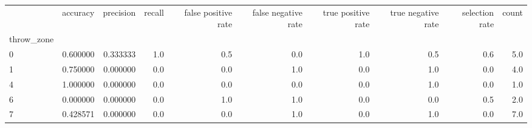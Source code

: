 \begin{tabular}{lrrrrrrrrr}
\toprule
{} &  accuracy &  precision &  recall &  false positive rate &  false negative rate &  true positive rate &  true negative rate &  selection rate &  count \\
throw\_zone &           &            &         &                      &                      &                     &                     &                 &        \\
\midrule
0          &  0.600000 &   0.333333 &     1.0 &                  0.5 &                  0.0 &                 1.0 &                 0.5 &             0.6 &    5.0 \\
1          &  0.750000 &   0.000000 &     0.0 &                  0.0 &                  1.0 &                 0.0 &                 1.0 &             0.0 &    4.0 \\
4          &  1.000000 &   0.000000 &     0.0 &                  0.0 &                  0.0 &                 0.0 &                 1.0 &             0.0 &    1.0 \\
6          &  0.000000 &   0.000000 &     0.0 &                  1.0 &                  1.0 &                 0.0 &                 0.0 &             0.5 &    2.0 \\
7          &  0.428571 &   0.000000 &     0.0 &                  0.0 &                  1.0 &                 0.0 &                 1.0 &             0.0 &    7.0 \\
\bottomrule
\end{tabular}
